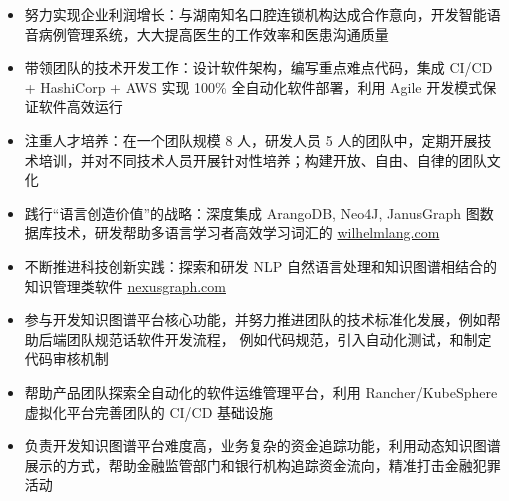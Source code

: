 \documentclass[10pt,a4paper,ragged2e,withhyper]{altacv}
\begin{document}

\makecvheader

\begin{paracol}{2}

    \begin{itemize}
        \item 努力实现企业利润增长：与湖南知名口腔连锁机构达成合作意向，开发智能语音病例管理系统，大大提高医生的工作效率和医患沟通质量
        \item 带领团队的技术开发工作：设计软件架构，编写重点难点代码，集成 CI/CD + HashiCorp + AWS 实现 100\% 全自动化软件部署，利用 Agile 开发模式保证软件高效运行
        \item 注重人才培养：在一个团队规模 8 人，研发人员 5 人的团队中，定期开展技术培训，并对不同技术人员开展针对性培养；构建开放、自由、自律的团队文化
        \item 践行“语言创造价值”的战略：深度集成 ArangoDB, Neo4J, JanusGraph 图数据库技术，研发帮助多语言学习者高效学习词汇的 \href{https://wilhelmlang.com/}{wilhelmlang.com}
        \item 不断推进科技创新实践：探索和研发 NLP 自然语言处理和知识图谱相结合的知识管理类软件 \href{https://nexusgraph.com/}{nexusgraph.com}
    \end{itemize}

    \divider

    \begin{itemize}
        \item 参与开发知识图谱平台核心功能，并努力推进团队的技术标准化发展，例如帮助后端团队规范话软件开发流程，
              例如代码规范，引入自动化测试，和制定代码审核机制
        \item 帮助产品团队探索全自动化的软件运维管理平台，利用 Rancher/KubeSphere 虚拟化平台完善团队的 CI/CD 基础设施
        \item 负责开发知识图谱平台难度高，业务复杂的资金追踪功能，利用动态知识图谱展示的方式，帮助金融监管部门和银行机构追踪资金流向，精准打击金融犯罪活动
    \end{itemize}


\end{paracol}
\end{document}
